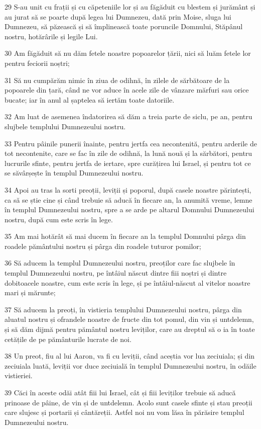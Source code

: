 \par 29 S-au unit cu frații și cu căpeteniile lor și au făgăduit cu blestem și jurământ și au jurat să se poarte după legea lui Dumnezeu, dată prin Moise, sluga lui Dumnezeu, să păzească și să împlinească toate poruncile Domnului, Stăpânul nostru, hotărârile și legile Lui.
\par 30 Am făgăduit să nu dăm fetele noastre popoarelor țării, nici să luăm fetele lor pentru feciorii noștri;
\par 31 Să nu cumpărăm nimic în ziua de odihnă, în zilele de sărbătoare de la popoarele din țară, când ne vor aduce în acele zile de vânzare mărfuri sau orice bucate; iar în anul al șaptelea să iertăm toate datoriile.
\par 32 Am luat de asemenea îndatorirea să dăm a treia parte de siclu, pe an, pentru slujbele templului Dumnezeului nostru.
\par 33 Pentru pâinile punerii înainte, pentru jertfa cea necontenită, pentru arderile de tot necontenite, care se fac în zile de odihnă, la lună nouă și la sărbători, pentru lucrurile sfinte, pentru jertfa de iertare, spre curățirea lui Israel, și pentru tot ce se săvârșește în templul Dumnezeului nostru.
\par 34 Apoi au tras la sorti preoții, leviții și poporul, după casele noastre părintești, ca să se știe cine și când trebuie să aducă în fiecare an, la anumită vreme, lemne în templul Dumnezeului nostru, spre a se arde pe altarul Domnului Dumnezeului nostru, după cum este scris în lege.
\par 35 Am mai hotărât să mai ducem în fiecare an la templul Domnului pârga din roadele pământului nostru și pârga din roadele tuturor pomilor;
\par 36 Să aducem la templul Dumnezeului nostru, preoților care fac slujbele în templul Dumnezeului nostru, pe întâiul născut dintre fiii noștri și dintre dobitoacele noastre, cum este scris în lege, și pe întâiul-născut al vitelor noastre mari și mărunte;
\par 37 Să aducem la preoți, în vistieria templului Dumnezeului nostru, pârga din aluatul nostru și ofrandele noastre de fructe din tot pomul, din vin și untdelemn, și să dăm dijmă pentru pământul nostru leviților, care au dreptul să o ia în toate cetățile de pe pământurile lucrate de noi.
\par 38 Un preot, fiu al lui Aaron, va fi cu leviții, când aceștia vor lua zeciuiala; și din zeciuiala luată, leviții vor duce zeciuială în templul Dumnezeului nostru, în odăile vistieriei.
\par 39 Căci în aceste odăi atât fiii lui Israel, cât și fiii leviților trebuie să aducă prinoase de pâine, de vin și de untdelemn. Acolo sunt casele sfinte și stau preoții care slujesc și portarii și cântăreții. Astfel noi nu vom lăsa în părăsire templul Dumnezeului nostru.

